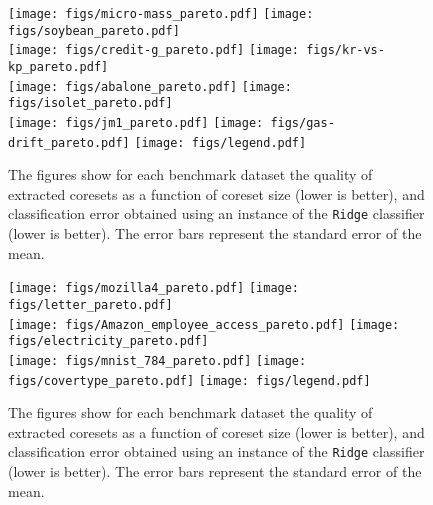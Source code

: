 \documentclass{article}
\begin{document}
\begin{figure*}[!htb]
    \centering
    
    \texttt{[image: figs/micro-mass\_pareto.pdf]}
    \texttt{[image: figs/soybean\_pareto.pdf]}\\
    \texttt{[image: figs/credit-g\_pareto.pdf]}
    \texttt{[image: figs/kr-vs-kp\_pareto.pdf]}\\
    \texttt{[image: figs/abalone\_pareto.pdf]}
    \texttt{[image: figs/isolet\_pareto.pdf]}\\    
    \texttt{[image: figs/jm1\_pareto.pdf]}
    \texttt{[image: figs/gas-drift\_pareto.pdf]}
    \texttt{[image: figs/legend.pdf]}
    
    
    \caption{The figures show for each benchmark dataset the quality of extracted coresets as a function of coreset size (lower is better), and classification error obtained using an instance of the \texttt{Ridge} classifier (lower is better). The error bars represent the standard error of the mean.}
    \label{fig:exp1}
    
\end{figure*}


\begin{figure*}[!htb]
    \centering
    

    \texttt{[image: figs/mozilla4\_pareto.pdf]}
    \texttt{[image: figs/letter\_pareto.pdf]}\\
    \texttt{[image: figs/Amazon\_employee\_access\_pareto.pdf]}
    \texttt{[image: figs/electricity\_pareto.pdf]}\\    \texttt{[image: figs/mnist\_784\_pareto.pdf]}
    \texttt{[image: figs/covertype\_pareto.pdf]}
    \texttt{[image: figs/legend.pdf]}
    
    
    \caption{The figures show for each benchmark dataset the quality of extracted coresets as a function of coreset size (lower is better), and classification error obtained using an instance of the \texttt{Ridge} classifier (lower is better). The error bars represent the standard error of the mean.}
    \label{fig:exp2}
    
\end{figure*}
\end{document}
